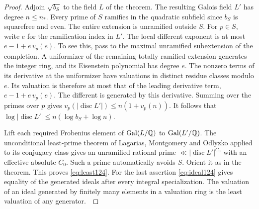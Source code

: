\documentclass[a4paper,11pt]{article}
\theoremstyle{definition}
\theoremstyle{remark}
\numberwithin{equation}{section}
\begin{document}
\begin{proof}
Adjoin \(\sqrt{b_S}\) to the field \(L\) of the theorem. The
resulting Galois field \(L'\) has degree \(n\le n_*\). Every
prime of \(S\) ramifies in the quadratic subfield since \(b_S\)
is squarefree and even. The entire extension is unramified
outside \(S\). For \(p\in S\), write \(e\) for the ramification
index in \(L'\). The local different exponent is at most
\(e-1+e\,v_p(e)\). To see this, pass to the maximal unramified
subextension of the completion. A uniformizer of the remaining
totally ramified extension generates the integer ring, and
its Eisenstein polynomial has degree \(e\). The nonzero
terms of its derivative at the uniformizer have valuations
in distinct residue classes modulo \(e\). Its valuation
is therefore at most that of the leading derivative term,
\(e-1+e\,v_p(e)\). The different is generated by this
derivative. Summing over the primes over \(p\) gives
\(v_p(|\operatorname{disc} L'|)\le n(1+v_p(n))\).
It follows that \(\log|\operatorname{disc} L'|\le
n(\log b_S+\log n)\).

Lift each required Frobenius element of \(\operatorname{Gal}(L/\mathbb Q)\)
to \(\operatorname{Gal}(L'/\mathbb Q)\). The unconditional least-prime theorem
of Lagarias, Montgomery and Odlyzko applied to its conjugacy
class gives an unramified rational prime
\(\ll |\operatorname{disc} L'|^{C_0}\) with an effective
absolute \(C_0\). Such a prime automatically avoids \(S\).
Orient it as in the theorem. This proves \eqref{eq:least124}. For the last
assertion \eqref{eq:ideal124} gives equality of the generated ideals after
every integral specialization. The valuation of an ideal
generated by finitely many elements in a valuation ring is
the least valuation of any generator.~\cite{VI-IV-VI-lmo124}
\end{proof}
\end{document}
